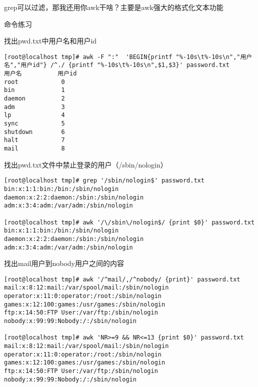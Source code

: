 grep可以过滤，那我还用你awk干啥？主要是awk强大的格式化文本功能
\begin{ascolorbox10}{命令练习}
	\begin{ascboxJ}{找出pwd.txt中用户名和用户id}
		\begin{lstlisting}[style=linux]
[root@localhost tmp]# awk -F ":"  'BEGIN{printf "%-10s\t%-10s\n","用户名","用户id"} /^./ {printf "%-10s\t%-10s\n",$1,$3}' password.txt
用户名          用户id
root            0
bin             1
daemon          2
adm             3
lp              4
sync            5
shutdown        6
halt            7
mail            8
		\end{lstlisting}
	\end{ascboxJ}

	\begin{ascboxJ}{找出pwd.txt文件中禁止登录的用户（/sbin/nologin）}
	\begin{lstlisting}[style=linux]
[root@localhost tmp]# grep '/sbin/nologin$' password.txt
bin:x:1:1:bin:/bin:/sbin/nologin
daemon:x:2:2:daemon:/sbin:/sbin/nologin
adm:x:3:4:adm:/var/adm:/sbin/nologin

[root@localhost tmp]# awk '/\/sbin\/nologin$/ {print $0}' password.txt
bin:x:1:1:bin:/bin:/sbin/nologin
daemon:x:2:2:daemon:/sbin:/sbin/nologin
adm:x:3:4:adm:/var/adm:/sbin/nologin
		\end{lstlisting}
	\end{ascboxJ}

	\begin{ascboxJ}{找出mail用户到nobody用户之间的内容}
	\begin{lstlisting}[style=linux]
[root@localhost tmp]# awk '/^mail/,/^nobody/ {print}' password.txt
mail:x:8:12:mail:/var/spool/mail:/sbin/nologin
operator:x:11:0:operator:/root:/sbin/nologin
games:x:12:100:games:/usr/games:/sbin/nologin
ftp:x:14:50:FTP User:/var/ftp:/sbin/nologin
nobody:x:99:99:Nobody:/:/sbin/nologin

[root@localhost tmp]# awk 'NR>=9 && NR<=13 {print $0}' password.txt
mail:x:8:12:mail:/var/spool/mail:/sbin/nologin
operator:x:11:0:operator:/root:/sbin/nologin
games:x:12:100:games:/usr/games:/sbin/nologin
ftp:x:14:50:FTP User:/var/ftp:/sbin/nologin
nobody:x:99:99:Nobody:/:/sbin/nologin
	\end{lstlisting}
\end{ascboxJ}
\end{ascolorbox10}

